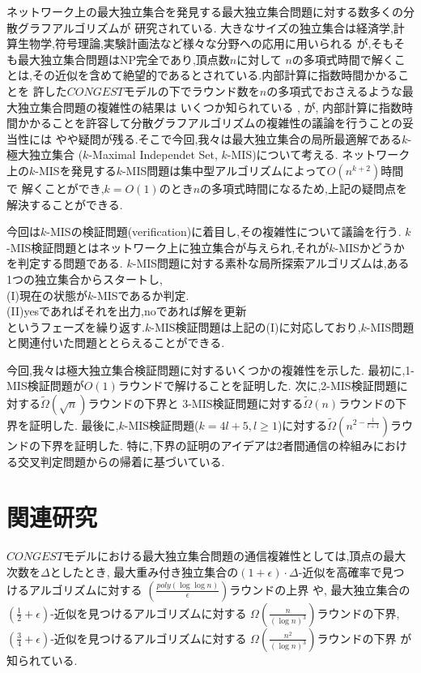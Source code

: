 \documentclass[12pt]{thesis}
\theoremstyle{definition}
\begin{document}
ネットワーク上の最大独立集合を発見する最大独立集合問題に対する数多くの分散グラフアルゴリズムが
研究されている.
大きなサイズの独立集合は経済学,計算生物学,符号理論,実験計画法など様々な分野への応用に用いられる \cite{kawarabayashi2019improved} が,そもそも最大独立集合問題はNP完全であり,頂点数$n$に対して
$n$の多項式時間で解くことは,その近似を含めて絶望的であるとされている.内部計算に指数時間かかることを
許した$CONGEST$モデルの下でラウンド数を$n$の多項式でおさえるような最大独立集合問題の複雑性の結果は
いくつか知られている \cite{kawarabayashi2019improved},  \cite{efron2020beyond}が,
内部計算に指数時間かかることを許容して分散グラフアルゴリズムの複雑性の議論を行うことの妥当性には
やや疑問が残る.そこで今回,我々は最大独立集合の局所最適解である$k$-極大独立集合
($k$-Maximal Independet Set, $k$-MIS)について考える.
ネットワーク上の$k$-MISを発見する$k$-MIS問題は集中型アルゴリズムによって$O(n^{k + 2})$時間で
解くことができ,$k = O(1)$のとき$n$の多項式時間になるため,上記の疑問点を解決することができる.

今回は$k$-MISの検証問題(verification)に着目し,その複雑性について議論を行う.
$k$-MIS検証問題とはネットワーク上に独立集合が与えられ,それが$k$-MISかどうかを判定する問題である.
$k$-MIS問題に対する素朴な局所探索アルゴリズムは,ある1つの独立集合からスタートし, \\
(I)現在の状態が$k$-MISであるか判定. \\
(II)yesであればそれを出力,noであれば解を更新 \\
というフェーズを繰り返す.$k$-MIS検証問題は上記の(I)に対応しており,$k$-MIS問題と関連付いた問題ととらえることができる.

今回,我々は極大独立集合検証問題に対するいくつかの複雑性を示した.
最初に,1-MIS検証問題が$O(1)$ラウンドで解けることを証明した.
次に,2-MIS検証問題に対する$\tilde{\Omega} (\sqrt{n})$ラウンドの下界と
3-MIS検証問題に対する$\tilde{\Omega} (n)$ラウンドの下界を証明した.
最後に,$k$-MIS検証問題($k = 4l + 5, l \geq 1$)に対する$\tilde{\Omega} (n^{2 - \frac{1}{l + 1}})$ラウンドの下界を証明した.
特に,下界の証明のアイデアは2者間通信の枠組みにおける交叉判定問題からの帰着に基づいている.

\section{関連研究} %
$CONGEST$モデルにおける最大独立集合問題の通信複雑性としては,頂点の最大次数を$\Delta$としたとき,
最大重み付き独立集合の$(1 + \epsilon) \cdot \Delta$-近似を高確率で見つけるアルゴリズムに対する
$(\frac{poly(\log \log n)}{\epsilon})$ラウンドの上界 \cite{kawarabayashi2019improved} や,
最大独立集合の$(\frac{1}{2} + \epsilon)$-近似を見つけるアルゴリズムに対する
$\Omega (\frac{n}{(\log n)^{3}})$ラウンドの下界,$(\frac{3}{4} + \epsilon)$-近似を見つけるアルゴリズムに対する
$\Omega (\frac{n^{2}}{(\log n)^{3}})$ラウンドの下界 \cite{efron2020beyond} が知られている.
 
\end{document}
